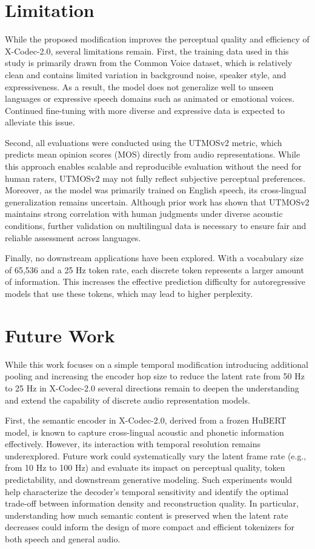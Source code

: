 \documentclass[preprint]{article}
\begin{document}
\section{Limitation}

While the proposed modification improves the perceptual quality and efficiency of X-Codec-2.0, several limitations remain.
First, the training data used in this study is primarily drawn from the Common Voice dataset, which is relatively clean and contains limited variation in background noise, speaker style, and expressiveness. As a result, the model does not generalize well to unseen languages or expressive speech domains such as animated or emotional voices. Continued fine-tuning with more diverse and expressive data is expected to alleviate this issue.

Second, all evaluations were conducted using the UTMOSv2 metric, which predicts mean opinion scores (MOS) directly from audio representations.
While this approach enables scalable and reproducible evaluation without the need for human raters, UTMOSv2 may not fully reflect subjective perceptual preferences.
Moreover, as the model was primarily trained on English speech, its cross-lingual generalization remains uncertain.
Although prior work has shown that UTMOSv2 maintains strong correlation with human judgments under diverse acoustic conditions, further validation on multilingual data is necessary to ensure fair and reliable assessment across languages.

Finally, no downstream applications have been explored. With a vocabulary size of 65,536 and a 25 Hz token rate, each discrete token represents a larger amount of information. This increases the effective prediction difficulty for autoregressive models that use these tokens, which may lead to higher perplexity.

\section{Future Work}

While this work focuses on a simple temporal modification introducing additional pooling and increasing the encoder hop size to reduce the latent rate from 50 Hz to 25 Hz in X-Codec-2.0 several directions remain to deepen the understanding and extend the capability of discrete audio representation models.

First, the semantic encoder in X-Codec-2.0, derived from a frozen HuBERT model, is known to capture cross-lingual acoustic and phonetic information effectively. However, its interaction with temporal resolution remains underexplored. Future work could systematically vary the latent frame rate (e.g., from 10 Hz to 100 Hz) and evaluate its impact on perceptual quality, token predictability, and downstream generative modeling. Such experiments would help characterize the decoder's temporal sensitivity and identify the optimal trade-off between information density and reconstruction quality. In particular, understanding how much semantic content is preserved when the latent rate decreases could inform the design of more compact and efficient tokenizers for both speech and general audio.
\end{document}
